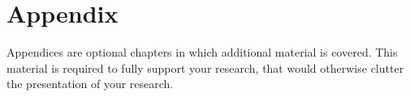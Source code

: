 \chapter{Appendix}\label{appendix}

Appendices are optional chapters in which additional material is covered. This material is required to fully support your research, that would otherwise
clutter the presentation of your research.



